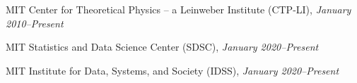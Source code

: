 \bbl
\item MIT Center for Theoretical Physics -- a Leinweber Institute (CTP-LI), \emph{January 2010--Present}
\item MIT Statistics and Data Science Center (SDSC), \emph{January 2020--Present}
\item MIT Institute for Data, Systems, and Society (IDSS), \emph{January 2020--Present}
\el

